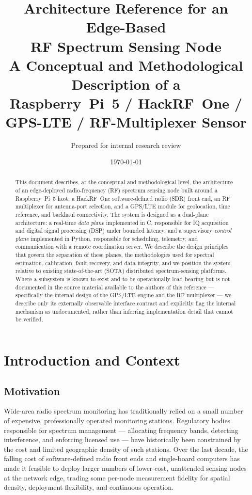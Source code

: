 \documentclass[11pt,a4paper]{article}
\title{
    \vspace{-1.5cm}
    {\Large\bfseries Architecture Reference for an Edge-Based\\ RF Spectrum Sensing Node}\\[0.3cm]
    {\large A Conceptual and Methodological Description of a\\ Raspberry~Pi~5 / HackRF~One / GPS-LTE / RF-Multiplexer Sensor}
}
\author{Prepared for internal research review}
\date{\today}
\begin{document}
\maketitle
\thispagestyle{fancy}

\begin{abstract}
\noindent
This document describes, at the conceptual and methodological level, the architecture of an
edge-deployed radio-frequency (RF) spectrum sensing node built around a Raspberry~Pi~5 host,
a HackRF~One software-defined radio (SDR) front end, an RF multiplexer for antenna-port
selection, and a GPS/LTE module for geolocation, time reference, and backhaul connectivity.
The system is designed as a dual-plane architecture: a real-time \emph{data plane} implemented
in C, responsible for IQ acquisition and digital signal processing (DSP) under bounded latency,
and a supervisory \emph{control plane} implemented in Python, responsible for scheduling,
telemetry, and communication with a remote coordination server. We describe the design
principles that govern the separation of these planes, the methodologies used for spectral
estimation, calibration, fault recovery, and data integrity, and we position the system
relative to existing state-of-the-art (SOTA) distributed spectrum-sensing platforms. Where
a subsystem is known to exist and to be operationally load-bearing but is not documented in
the source material available to the authors of this reference --- specifically the internal
design of the GPS/LTE engine and the RF multiplexer --- we describe only its externally
observable interface contract and explicitly flag the internal mechanism as undocumented,
rather than inferring implementation detail that cannot be verified.
\end{abstract}

\tableofcontents

\section{Introduction and Context}

\subsection{Motivation}

Wide-area radio spectrum monitoring has traditionally relied on a small number of expensive,
professionally operated monitoring stations. Regulatory bodies responsible for spectrum
management --- allocating frequency bands, detecting interference, and enforcing licensed use
--- have historically been constrained by the cost and limited geographic density of such
stations. Over the last decade, the falling cost of software-defined radio front ends and
single-board computers has made it feasible to deploy larger numbers of lower-cost, unattended
sensing nodes at the network edge, trading some per-node measurement fidelity for spatial
density, deployment flexibility, and continuous operation.
\end{document}
